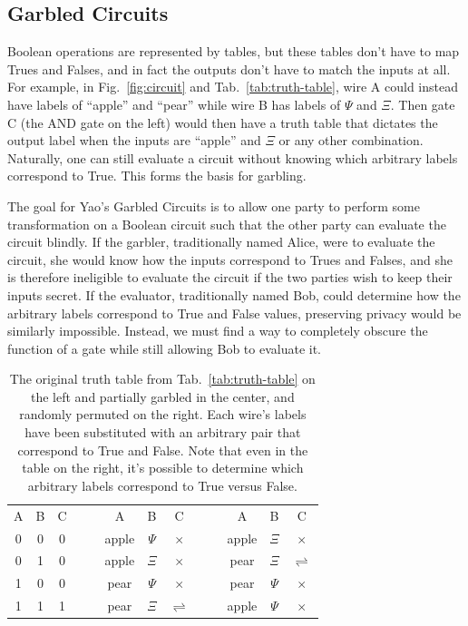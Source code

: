 \subsection{Garbled Circuits}\label{sec:gc}
Boolean operations are represented by tables, but these tables don't have to map Trues and Falses, and in fact the outputs don't have to match the inputs at all. For example, in Fig.~\ref{fig:circuit} and Tab.~\ref{tab:truth-table}, wire A could instead have labels of ``apple'' and ``pear'' while wire B has labels of $\Psi$ and $\Xi$. Then gate C (the AND gate on the left) would then have a truth table that dictates the output label when the inputs are ``apple'' and $\Xi$ or any other combination. Naturally, one can still evaluate a circuit without knowing which arbitrary labels correspond to True. This forms the basis for garbling.

The goal for Yao's Garbled Circuits is to allow one party to perform some transformation on a Boolean circuit such that the other party can evaluate the circuit blindly. If the garbler, traditionally named Alice, were to evaluate the circuit, she would know how the inputs correspond to Trues and Falses, and she is therefore ineligible to evaluate the circuit if the two parties wish to keep their inputs secret. If the evaluator, traditionally named Bob, could determine how the arbitrary labels correspond to True and False values, preserving privacy would be similarly impossible. Instead, we must find a way to completely obscure the function of a gate while still allowing Bob to evaluate it.

\begin{table}[t]
	\centering
	\begin{tabular}{cc|c   cc   cc|c   cc   cc|c}
		A & B & C   &&&   A     & B      & C          &&&   A     & B      & C \\
		\cmidrule{1-3}    \cmidrule{6-8}                    \cmidrule{11-13}
		0 & 0 & 0   &&&   apple & $\Psi$ & $\times$   &&&   apple & $\Xi$  & $\times$ \\
		0 & 1 & 0   &&&   apple & $\Xi$  & $\times$   &&&   pear  & $\Xi$  & $\rightleftharpoons$ \\
		1 & 0 & 0   &&&   pear  & $\Psi$ & $\times$   &&&   pear  & $\Psi$ & $\times$ \\
		1 & 1 & 1   &&&   pear  & $\Xi$  & $\rightleftharpoons$   &&&   apple & $\Psi$ & $\times$ \\
	\end{tabular}
	\caption{The original truth table from Tab.~\ref{tab:truth-table} on the left and partially garbled in the center, and randomly permuted on the right. Each wire's labels have been substituted with an arbitrary pair that correspond to True and False. Note that even in the table on the right, it's possible to determine which arbitrary labels correspond to True versus False.}%
	\label{tab:garbled-table}
\end{table}

